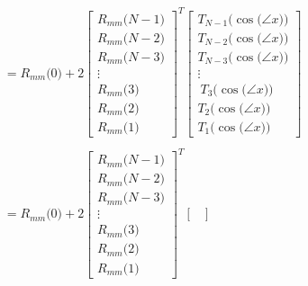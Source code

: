 \documentclass{article}
\begin{document}
\begin{align*}
    &= R_{mm}\big(0\big) + 2\begin{bmatrix}
                                R_{mm}\big(N - 1\big) \\
                                R_{mm}\big(N - 2\big) \\
                                R_{mm}\big(N - 3\big) \\
                                \vdots \\
                                R_{mm}\big(3\big) \\
                                R_{mm}\big(2\big) \\
                                R_{mm}\big(1\big)
                              \end{bmatrix}^{T}
                            \begin{bmatrix}
                                T_{N - 1}\Big(\cos\big(\angle{x}\big)\Big) \\
                                T_{N - 2}\Big(\cos\big(\angle{x}\big)\Big) \\
                                T_{N - 3}\Big(\cos\big(\angle{x}\big)\Big) \\
                                \vdots \\\
                                T_{3}\Big(\cos\big(\angle{x}\big)\Big) \\
                                T_{2}\Big(\cos\big(\angle{x}\big)\Big) \\
                                T_{1}\Big(\cos\big(\angle{x}\big)\Big) \end{bmatrix} \\ \\
    &= R_{mm}\big(0\big) + 2\begin{bmatrix}
                                R_{mm}\big(N - 1\big) \\
                                R_{mm}\big(N - 2\big) \\
                                R_{mm}\big(N - 3\big) \\
                                \vdots \\
                                R_{mm}\big(3\big) \\
                                R_{mm}\big(2\big) \\
                                R_{mm}\big(1\big)
                              \end{bmatrix}^{T}
                            \begin{bmatrix}

\end{bmatrix}
\end{align*}
\end{document}
